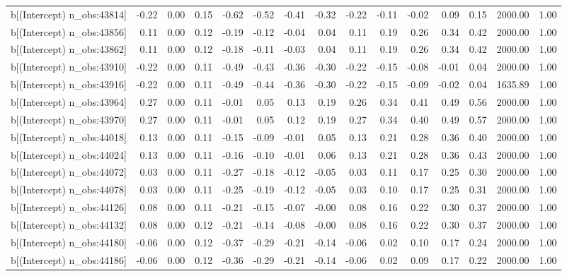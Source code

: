 \begin{table}[ht]
\begin{tabular}{rrrrrrrrrrrrrrr}
  b[(Intercept) n\_obs:43814] & -0.22 & 0.00 & 0.15 & -0.62 & -0.52 & -0.41 & -0.32 & -0.22 & -0.11 & -0.02 & 0.09 & 0.15 & 2000.00 & 1.00 \\ 
  b[(Intercept) n\_obs:43856] & 0.11 & 0.00 & 0.12 & -0.19 & -0.12 & -0.04 & 0.04 & 0.11 & 0.19 & 0.26 & 0.34 & 0.42 & 2000.00 & 1.00 \\ 
  b[(Intercept) n\_obs:43862] & 0.11 & 0.00 & 0.12 & -0.18 & -0.11 & -0.03 & 0.04 & 0.11 & 0.19 & 0.26 & 0.34 & 0.42 & 2000.00 & 1.00 \\ 
  b[(Intercept) n\_obs:43910] & -0.22 & 0.00 & 0.11 & -0.49 & -0.43 & -0.36 & -0.30 & -0.22 & -0.15 & -0.08 & -0.01 & 0.04 & 2000.00 & 1.00 \\ 
  b[(Intercept) n\_obs:43916] & -0.22 & 0.00 & 0.11 & -0.49 & -0.44 & -0.36 & -0.30 & -0.22 & -0.15 & -0.09 & -0.02 & 0.04 & 1635.89 & 1.00 \\ 
  b[(Intercept) n\_obs:43964] & 0.27 & 0.00 & 0.11 & -0.01 & 0.05 & 0.13 & 0.19 & 0.26 & 0.34 & 0.41 & 0.49 & 0.56 & 2000.00 & 1.00 \\ 
  b[(Intercept) n\_obs:43970] & 0.27 & 0.00 & 0.11 & -0.01 & 0.05 & 0.12 & 0.19 & 0.27 & 0.34 & 0.40 & 0.49 & 0.57 & 2000.00 & 1.00 \\ 
  b[(Intercept) n\_obs:44018] & 0.13 & 0.00 & 0.11 & -0.15 & -0.09 & -0.01 & 0.05 & 0.13 & 0.21 & 0.28 & 0.36 & 0.40 & 2000.00 & 1.00 \\ 
  b[(Intercept) n\_obs:44024] & 0.13 & 0.00 & 0.11 & -0.16 & -0.10 & -0.01 & 0.06 & 0.13 & 0.21 & 0.28 & 0.36 & 0.43 & 2000.00 & 1.00 \\ 
  b[(Intercept) n\_obs:44072] & 0.03 & 0.00 & 0.11 & -0.27 & -0.18 & -0.12 & -0.05 & 0.03 & 0.11 & 0.17 & 0.25 & 0.30 & 2000.00 & 1.00 \\ 
  b[(Intercept) n\_obs:44078] & 0.03 & 0.00 & 0.11 & -0.25 & -0.19 & -0.12 & -0.05 & 0.03 & 0.10 & 0.17 & 0.25 & 0.31 & 2000.00 & 1.00 \\ 
  b[(Intercept) n\_obs:44126] & 0.08 & 0.00 & 0.11 & -0.21 & -0.15 & -0.07 & -0.00 & 0.08 & 0.16 & 0.22 & 0.30 & 0.37 & 2000.00 & 1.00 \\ 
  b[(Intercept) n\_obs:44132] & 0.08 & 0.00 & 0.12 & -0.21 & -0.14 & -0.08 & -0.00 & 0.08 & 0.16 & 0.22 & 0.30 & 0.37 & 2000.00 & 1.00 \\ 
  b[(Intercept) n\_obs:44180] & -0.06 & 0.00 & 0.12 & -0.37 & -0.29 & -0.21 & -0.14 & -0.06 & 0.02 & 0.10 & 0.17 & 0.24 & 2000.00 & 1.00 \\ 
  b[(Intercept) n\_obs:44186] & -0.06 & 0.00 & 0.12 & -0.36 & -0.29 & -0.21 & -0.14 & -0.06 & 0.02 & 0.09 & 0.17 & 0.22 & 2000.00 & 1.00 \\ 

\end{tabular}
\end{table}

